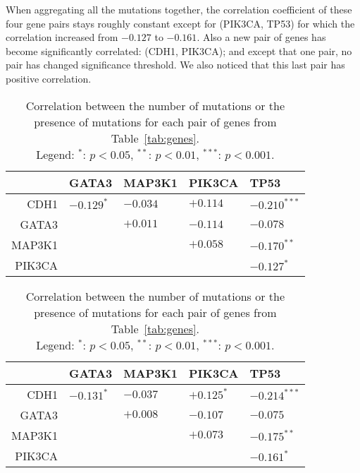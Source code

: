 \documentclass[letterpaper]{article}
\begin{document}
When aggregating all the mutations together, the correlation coefficient of these four gene pairs stays roughly constant except for (PIK3CA, TP53) for which the
correlation increased from $-0.127$ to $-0.161$. Also a new pair of genes has become significantly correlated: (CDH1, PIK3CA); and except that one pair,
no pair has changed significance threshold. We also noticed that this last pair has positive correlation.

\begin{table}[!h]
\footnotesize
\begin{subtable}{.48\textwidth}
\begin{tabular}{r|l|l|l|l}
       & GATA3        & MAP3K1   & PIK3CA       & TP53           \\ \hline
CDH1   & $-0.129^{*}$ & $-0.034$ & $+0.114$     & $-0.210^{***}$ \\ \hline
GATA3  &              & $+0.011$ & $-0.114$     & $-0.078$       \\ \hline
MAP3K1 &              &          & $+0.058$     & $-0.170^{**}$  \\ \hline
PIK3CA &              &          &              & $-0.127^{*}$
\end{tabular}
\end{subtable}
\begin{subtable}{.48\textwidth}
\begin{tabular}{r||l|l|l|l}
       & GATA3        & MAP3K1   & PIK3CA       & TP53           \\ \hline \hline
CDH1   & $-0.131^{*}$ & $-0.037$ & $+0.125^{*}$ & $-0.214^{***}$ \\ \hline
GATA3  &              & $+0.008$ & $-0.107$     & $-0.075$       \\ \hline
MAP3K1 &              &          & $+0.073$     & $-0.175^{**}$  \\ \hline
PIK3CA &              &          &              & $-0.161^{*}$
\end{tabular}
\end{subtable}
\caption{Correlation between the number of mutations or the presence of mutations for each pair of genes from Table~\ref{tab:genes}. \\
{\scriptsize Legend: $^{*}$: $p < 0.05$, $^{**}$: $p < 0.01$, $^{***}$: $p < 0.001$}.\label{tab:correlations}}
\end{table}
\end{document}
